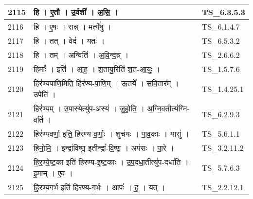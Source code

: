 \documentclass[17pt]{extarticle}
\begin{document}
\begin{longtable}{||p{0.4in}||p{4.9in}||p{0.9in}||}
    \hline
        
    2115 & हि   ।   ए॒तौ   ।   उ॒र्वशी᳚   ।   अ॒सि॒   ।    & TS\_6.3.5.3       \\
    
    \hline
        
    2116 & हि   ।   ए॒षः   ।   सन्न्   ।   मर्त्ये॑षु   ।    & TS\_6.1.4.7       \\
    
    \hline
        
    2117 & हि   ।   तत्   ।   वेद॑   ।   यतः॑   ।    & TS\_6.5.3.2       \\
    
    \hline
        
    2118 & हि   ।   तम्   ।   अन्विति॑   ।   अ॒वि॒न्द॒न्न्   ।    & TS\_2.6.6.2       \\
    
    \hline
        
    2119 & हिमाः᳚   ।   इति॑   ।   आ॒ह॒   ।   श॒तायु॒रिति॑ श॒त{-}आ॒युः॒   ।    & TS\_1.5.7.6       \\
    
    \hline
        
    2120 & हिर॑ण्यपाणि॒मिति॒ हिर॑ण्य{-}पा॒णि॒म्   ।   ऊ॒तये᳚   ।   स॒वि॒तार᳚म्   ।   उपेति॑   ।    & TS\_1.4.25.1       \\
    
    \hline
        
    2121 & हिर॑ण्यम्   ।   उ॒पास्येत्यु॑प{-}अस्य॑   ।   जु॒हो॒ति॒   ।   अ॒ग्नि॒वतीत्य॑ग्नि{-}वति॑   ।    & TS\_6.2.9.3       \\
    
    \hline
        
    2122 & हिर॑ण्यवर्णा॒ इति॒ हिर॑ण्य{-}व॒र्णाः॒   ।   शुच॑यः   ।   पा॒व॒काः   ।   यासु॑   ।    & TS\_5.6.1.1       \\
    
    \hline
        
    2123 & हि॒नो॒मि॒   ।   इन्द्रा॑विष्णू॒ इतीन्द्रा᳚{-}वि॒ष्णू॒   ।   अप॑सः   ।   पा॒रे   ।    & TS\_3.2.11.2       \\
    
    \hline
        
    2124 & हि॒र॒ण्ये॒ष्ट॒का इति॑ हिरण्य{-}इ॒ष्ट॒काः   ।   उ॒प॒दधा॒तीत्यु॑प{-}दधा॑ति   ।   इ॒मान्   ।   ए॒व   ।    & TS\_5.7.6.3       \\
    
    \hline
        
    2125 & हि॒र॒ण्य॒ग॒र्भ इति॑ हिरण्य{-}ग॒र्भः   ।   आपः॑   ।   ह॒   ।   यत्   ।    & TS\_2.2.12.1       \\
    

\end{longtable}
\end{document}
